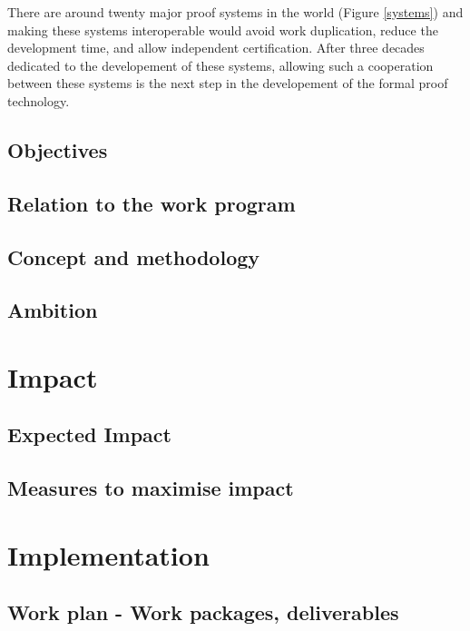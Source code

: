 \documentclass[12pt]{book}
\begin{document}
There are around twenty major proof systems in the world
(Figure \ref{systems}) and making these systems interoperable would avoid work
duplication, reduce the development time, and allow independent
certification.  After three decades dedicated to the developement of
these systems, allowing such a cooperation between these systems is
the next step in the developement of the formal proof technology.

\section{Objectives}



\section{Relation to the work program}



\section{Concept and methodology}



\section{Ambition}



\chapter{Impact}

\section{Expected Impact}



\section{Measures to maximise impact}

\chapter{Implementation}

\section{Work plan - Work packages, deliverables}
\end{document}
